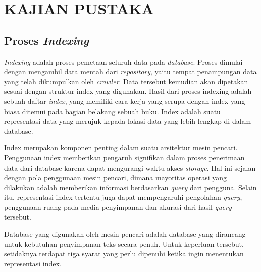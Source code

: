 
\chapter{KAJIAN PUSTAKA}

\section{Proses \emph{Indexing}}

\emph{Indexing} adalah proses pemetaan seluruh data pada \emph{database}.
Proses dimulai dengan mengambil data mentah dari \emph{repository}, yaitu tempat
penampungan data yang telah dikumpulkan oleh \emph{crawler}. Data tersebut
kemudian akan dipetakan sesuai dengan struktur index yang digunakan. Hasil dari
proses indexing adalah sebuah daftar \emph{index}, yang memiliki cara kerja yang
serupa dengan index yang biasa ditemui pada bagian belakang sebuah buku. Index
adalah suatu representasi data yang merujuk kepada lokasi data yang lebih
lengkap di dalam database.

Index merupakan komponen penting dalam suatu arsitektur mesin pencari.
Penggunaan index memberikan pengaruh signifikan dalam proses penerimaan data
dari database karena dapat mengurangi waktu akses \emph{storage}. Hal ini
sejalan dengan pola penggunaan mesin pencari, dimana mayoritas operasi yang
dilakukan adalah memberikan informasi berdasarkan \emph{query} dari pengguna.
Selain itu, representasi index tertentu juga dapat mempengaruhi pengolahan
\emph{query}, penggunaan ruang pada media penyimpanan dan akurasi dari hasil
\emph{query} tersebut.

Database yang digunakan oleh mesin pencari adalah database yang dirancang
untuk kebutuhan penyimpanan teks secara penuh. Untuk keperluan tersebut,
setidaknya terdapat tiga syarat yang perlu dipenuhi ketika ingin menentukan
representasi index.

